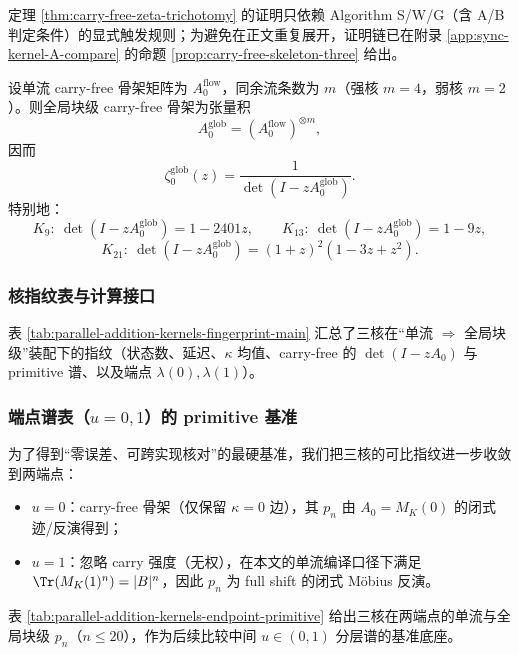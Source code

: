 \begin{remark}[可审计证明位置]
定理 \ref{thm:carry-free-zeta-trichotomy} 的证明只依赖 Algorithm S/W/G（含 A/B 判定条件）的显式触发规则；为避免在正文重复展开，证明链已在附录 \ref{app:sync-kernel-A-compare} 的命题 \ref{prop:carry-free-skeleton-three} 给出。
\end{remark}

\begin{corollary}\label{cor:global-assembly-zeta}
设单流 carry-free 骨架矩阵为 $A_0^{\mathrm{flow}}$，同余流条数为 $m$（强核 $m=4$，弱核 $m=2$）。则全局块级 carry-free 骨架为张量积
\[
A_0^{\mathrm{glob}}=(A_0^{\mathrm{flow}})^{\otimes m},
\]
因而
\[
\zeta^{\mathrm{glob}}_0(z)=\frac{1}{\det(I-zA_0^{\mathrm{glob}})}.
\]
特别地：
\[
K_9:\ \det(I-zA_0^{\mathrm{glob}})=1-2401z,\qquad
K_{13}:\ \det(I-zA_0^{\mathrm{glob}})=1-9z,
\]
\[
K_{21}:\ \det(I-zA_0^{\mathrm{glob}})=(1+z)^2(1-3z+z^2).
\]
\end{corollary}

\subsubsection{核指纹表与计算接口}
表 \ref{tab:parallel-addition-kernels-fingerprint-main} 汇总了三核在“单流 $\Rightarrow$ 全局块级”装配下的指纹（状态数、延迟、$\kappa$ 均值、carry-free 的 $\det(I-zA_0)$ 与 primitive 谱、以及端点 $\lambda(0),\lambda(1)$）。


\subsubsection{端点谱表（\texorpdfstring{$u=0,1$}{u=0,1}）的 primitive 基准}\label{subsec:kernel-endpoint-primitive}
为了得到“零误差、可跨实现核对”的最硬基准，我们把三核的可比指纹进一步收敛到两端点：
\begin{itemize}
  \item $u=0$：carry-free 骨架（仅保留 $\kappa=0$ 边），其 $p_n$ 由 $A_0=M_K(0)$ 的闭式迹/反演得到；
  \item $u=1$：忽略 carry 强度（无权），在本文的单流编译口径下满足 $\Tr(M_K(1)^n)=|B|^n$，因此 $p_n$ 为 full shift 的闭式 Möbius 反演。
\end{itemize}
表 \ref{tab:parallel-addition-kernels-endpoint-primitive} 给出三核在两端点的单流与全局块级 $p_n$（$n\le 20$），作为后续比较中间 $u\in(0,1)$ 分层谱的基准底座。



